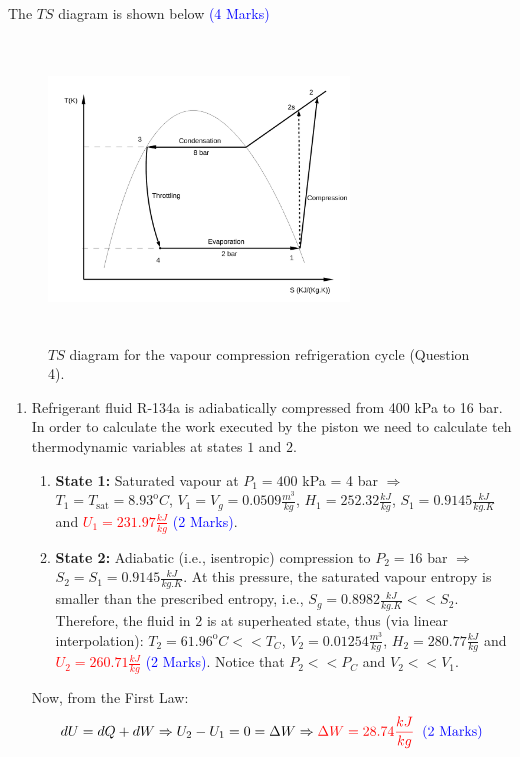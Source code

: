 \documentclass[12pt,twoside]{report}
\newcommand{\frc}{\displaystyle\frac}
\begin{document}
\begin{description}
\item The $TS$ diagram is shown below \textcolor{blue}{(4 Marks)}
\begin{figure}[h]
\label{Ex02:Q04b}
\begin{center}
\includegraphics[width=8.0cm,height=8.0cm]{./Pics/Exam_Refrigeration4_TS}
\vspace{-.4cm}
\caption{$TS$ diagram for the vapour compression refrigeration cycle (Question 4).}
\end{center}
\end{figure}


\clearpage

\item [Question 5:] 


\begin{enumerate}

\item Refrigerant fluid R-134a is adiabatically compressed from 400 kPa to 16 bar. In order to calculate the work executed by the piston we need to calculate teh thermodynamic variables at states $1$ and $2$.
\begin{enumerate}
%
\item {\bf State 1:} Saturated vapour at $P_{1}=400$ kPa = 4 bar $\Rightarrow$ $T_{1}=T_{\text{sat}}=8.93^{\text{o}}C$, $V_{1}=V_{g}=0.0509\frc{m^{3}}{kg}$, $H_{1}=252.32\frc{kJ}{kg}$, $S_{1}=0.9145\frc{kJ}{kg.K}$ and \textcolor{red}{$U_{1}=231.97\frc{kJ}{kg}$} \textcolor{blue}{(2 Marks)}. 
%
\item {\bf State 2:} Adiabatic (i.e., isentropic) compression to $P_{2}=16$ bar $\Rightarrow$ $S_{2}=S_{1}=0.9145\frc{kJ}{kg.K}$. At this pressure, the saturated vapour entropy is smaller than the prescribed entropy, i.e., $S_{g}=0.8982\frc{kJ}{kg.K}<<S_{2}$. Therefore, the fluid in $2$ is at superheated state, thus (via linear interpolation): $T_{2}=61.96^{\text{o}}C<<T_{C}$, $V_{2}=0.01254\frc{m^{3}}{kg}$, $H_{2}=280.77\frc{kJ}{kg}$ and \textcolor{red}{$U_{2}=260.71\frc{kJ}{kg}$} \textcolor{blue}{(2 Marks)}. Notice that $P_{2} << P_{C}$ and $V_{2} << V_{1}$. 
%
\end{enumerate}
 Now, from the First Law:
\begin{displaymath}
dU = dQ + dW \Rightarrow U_{2}-U_{1} = 0 = \Delta W \Rightarrow \textcolor{red}{\Delta W = 28.74 \frc{kJ}{kg}} \;\;\textcolor{blue}{\text{(2 Marks)}}
\end{displaymath}


\end{enumerate}
\end{description}
\end{document}
